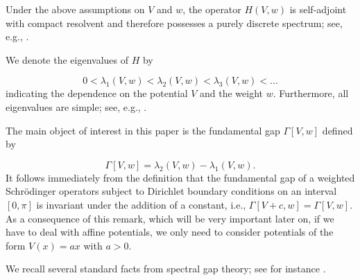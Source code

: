 \documentclass[12pt,a4paper]{amsart}
\begin{document}
\noindent Under the above assumptions on $V$ and $w$, the operator $H(V,w)$ is self-adjoint with compact resolvent and therefore possesses a purely discrete spectrum; see, e.g., \cite{AHRA,Wei}. 



\noindent We denote the eigenvalues of $H$ by


$$
0<\lambda_1(V, w)<\lambda_2(V, w)<\lambda_3(V, w)<...
$$
indicating the dependence on the potential $V$ and the weight $w$. Furthermore, all eigenvalues are simple; see, e.g., \cite{Zett, Wei}.

The main object of interest in this paper is the fundamental gap $\Gamma[V, w]$ defined by  

 $$\Gamma[V, w] = \lambda_2(V, w)- \lambda_1(V, w).$$
It follows immediately from the definition that the fundamental gap of a weighted Schr\"{o}dinger operators subject to
Dirichlet boundary conditions on an interval $[0,\pi]$ is invariant under the addition of a constant, i.e.,
$ \Gamma[V+c,w]= \Gamma[V,w]$.
As a consequence of this remark, which will be very important later on, if we have 
to deal with affine potentials, we only need to consider potentials of the form
$V(x)=ax $  with $a>0$. 

We recall several standard facts from spectral gap theory; see for instance \cite{Ash1,Lavine,ElAHar}.


\end{document}
